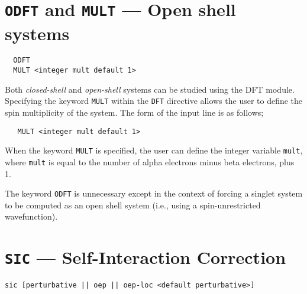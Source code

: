 \fussy

\section{{\tt ODFT} and {\tt MULT} --- Open shell systems}
\begin{verbatim}
  ODFT
  MULT <integer mult default 1>
\end{verbatim}

Both {\sl closed-shell} and {\sl open-shell} systems can be studied using
the DFT module.  Specifying the keyword \verb+MULT+ within the \verb+DFT+
directive allows the user to define the spin multiplicity of the system.
The form of the input line is as follows;
\begin{verbatim}
   MULT <integer mult default 1> 
\end{verbatim}
When the keyword \verb+MULT+ is specified, the user can define the integer
variable \verb+mult+, where \verb+mult+ is equal to the number of alpha 
electrons minus beta electrons, plus 1.

The keyword \verb+ODFT+ is unnecessary except in the context
of forcing a singlet system to be computed as an open shell
system (i.e., using a spin-unrestricted wavefunction).

\section{{\tt SIC} --- Self-Interaction Correction}

\begin{verbatim}
sic [perturbative || oep || oep-loc <default perturbative>]
\end{verbatim}

